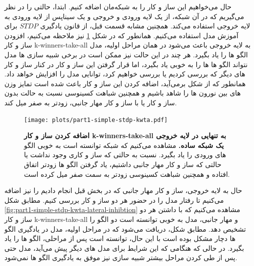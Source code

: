    حال می‌خواهیم این ساز و کار را به شبکه‌مان اضافه کنیم. ابتدا، حالتی را در نظر می‌گیریم که در آن شبکه، از یک لایه ورودی و خروجی و یک سیناپس از لایه ورودی به لایه خروجی استفاده می‌کند. همچنین مشابه قسمت قبل، از قانون یادگیری 
    $STDP$ 
    برای آموزش مدل استفاده می‌کنیم. همانطور که در شکل 
    \ref{fig:part1-simple-stdp-kwta}
    نیز ملاحظه می‌کنیم، افزودن ساز و کار 
    k-winners-take-all 
    به لایه خروجی باعث می‌شود در همان مراحل اولیه، مدل الگو ها را یاد بگیرد. هر چند در این حالت نیز ممکن است در برخی شبیه سازی ها مدل نتواند الگو ها ها را به خوبی یاد بگیرد، اما قرار گرفتن این ساز و کار  در کنار ساز و کار های دیگر که بررسی کردیم یا بررسی خواهیم کرد، توانایی مدل را افزایش خواهد داد. همانطور که از شکل برمی‌آید، اضافه کردن این ساز و کار باعث شده است تمایز وزن های بین نورون ها را شاهد باشیم و همچنین شباهت کسینوسی نسبت به حالت بدون ساز و کار یا با ساز و کار مهار جانبی، زودتر به صفر میل کند.

    \begin{figure}[!ht]
        \centering
        \texttt{[image: plots/part1-simple-stdp-kwta.pdf]} 
        \captionsetup{width=.85\linewidth}
        \caption{\textbf{اضافه کردن ساز و کار 
        k-winners-take-all
        به تنهایی در لایه خروجی یک شبکه ساده. } 
        مشاهده می‌کنیم که شبکه توانسته است به خوبی الگو های ورودی را یاد بگیرد. نسبت به حالتی که ساز و کاری وجود نداشت یا حالتی که ساز و کار مهار جانبی داشتیم، یاد گرفتن الگو ها زودتر اتفاق افتاده و همچنین شباهت کسینوسی زودتر به سمت صفر میل کرده است. 
        }
        \label{fig:part1-simple-stdp-kwta}
    \end{figure}

    حال به لایه خروجی، ساز و کار مهار جانبی که در بخش قبل انجام دادیم را نیز اضافه می‌کنیم تا رفتار مدل را در حضور هر دو ساز و کار بررسی کنیم. مطابق شکل 
    \ref{fig:part1-simple-stdp-kwta-lateral-inhibtion}
    مشاهده می‌کنیم که با داشتن هر دو ساز و کار 
    k-winners-take-all 
    و مهار جانبی، مدل به خوبی توانسته است دو الگو را تشخیص دهد. مطابق شکل، دریافت می‌شود که در مراحل اولیه، مدل در یادگیری الگو ها دچار مشکل بوده است با این حال، توانسته است پس از مراحلی، الگو ها را یاد بگیرد. در حالی که هنگامی که این شرایط برای مدل های دیگر پیش می‌آید، مدل حتی پس از طی کردن مراحل بیشتر شبیه سازی نیز موفق به یادگیری الگو ها نمی‌شود.

